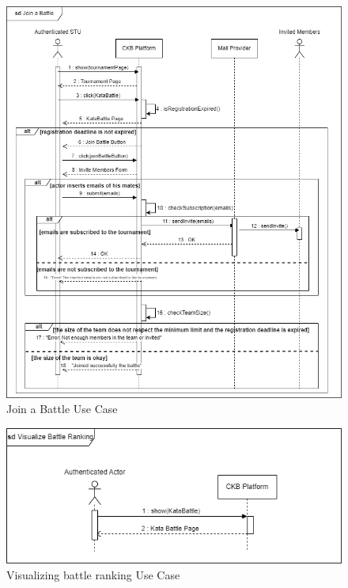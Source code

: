 \begin{figure}[H]
    \centering
    \includegraphics[width=1\textwidth]{images/sequence_diagrams/ClassDiagram-UC7-SequenceDiagram.png}
    \caption{Join a Battle Use Case}
    \label{fig:uc7}
\end{figure}
\begin{figure}[H]
    \centering
    \includegraphics[width=1\textwidth]{images/sequence_diagrams/ClassDiagram-UC12-SequenceDiagram.png}
    \caption{Visualizing battle ranking Use Case}
    \label{fig:uc12}
\end{figure}
